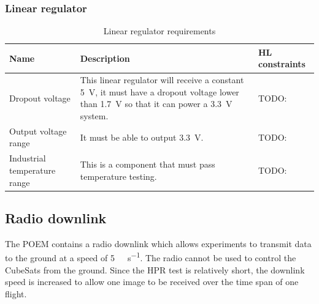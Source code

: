 \documentclass{report}
\begin{document}
\subsubsection{Linear regulator}

\begin{table}[H]
  \centering
  \begin{tabular}{|p{}|p{}|p{}|}
    \hline
    \textbf{Name}                & \textbf{Description}                                                                                                                                                  & \textbf{HL constraints} \\ \hline
    Dropout voltage              & This linear regulator will receive a constant \SI{5}{\volt}, it must have a dropout voltage lower than \SI{1.7}{\volt} so that it can power a \SI{3.3}{\volt} system. & TODO:                   \\\hline
    Output voltage range         & It must be able to output \SI{3.3}{\volt}.                                                                                                                            & TODO:                   \\\hline
    Industrial temperature range & This is a component that must pass temperature testing.                                                                                                               & TODO:                   \\\hline
  \end{tabular}
  \caption{Linear regulator requirements}
  \label{tabl:ldo-requirements}
\end{table}


\subsection{Radio downlink}

The POEM contains a radio downlink which allows experiments to transmit data to the ground at a speed of \SI{5}{\kilo\bit\per\second}. The radio cannot be used to control the CubeSats from the ground. Since the HPR test is relatively short, the downlink speed is increased to allow one image to be received over the time span of one flight.
\end{document}
